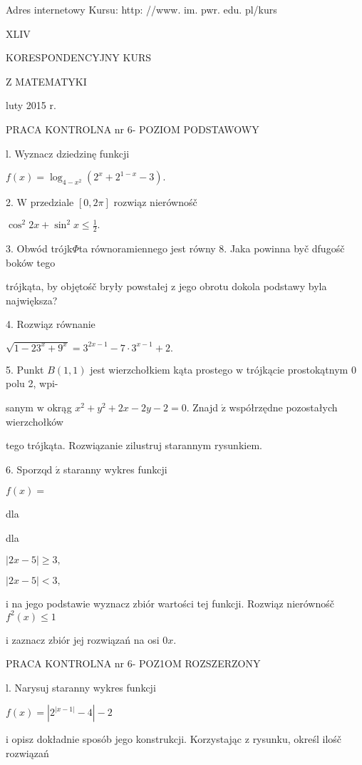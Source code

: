 \documentclass[a4paper,12pt]{article}
\begin{document}
Adres internetowy Kursu: http: //www. im. pwr. edu. pl/kurs







XLIV

KORESPONDENCYJNY KURS

Z MATEMATYKI

luty 2015 r.

PRACA KONTROLNA nr 6- POZIOM PODSTAWOWY

l. Wyznacz dziedzinę funkcji

$f(x)=\log_{4-x^{2}}(2^{x}+2^{1-x}-3).$

2. $\mathrm{W}$ przedziale $[0,2\pi]$ rozwiąz nierównośč

$\displaystyle \cos^{2}2x+\sin^{2}x\leq\frac{1}{2}.$

3. Obwód trójk$\Phi$ta równoramiennego jest równy 8. Jaka powinna byč dfugośč boków tego

trójkąta, by objętośč bryły powstałej $\mathrm{z}$ jego obrotu dokola podstawy byla największa?

4. Rozwiąz równanie

$\sqrt{1-23^{x}+9^{x}}=3^{2x-1}-7\cdot 3^{x-1}+2.$

5. Punkt $B(1,1)$ jest wierzchołkiem kąta prostego $\mathrm{w}$ trójkącie prostokątnym $0$ polu 2, wpi-

sanym $\mathrm{w}$ okrąg $x^{2}+y^{2}+2x-2y-2=0.$ Znajd $\acute{\mathrm{z}}$ współrzędne pozostałych wierzchołków

tego trójkąta. Rozwiązanie zilustruj starannym rysunkiem.

6. Sporzqd $\acute{\mathrm{z}}$ staranny wykres funkcji

$f(x)=$

dla

dla

$|2x-5|\geq 3,$

$|2x-5|<3,$

$\mathrm{i}$ na jego podstawie wyznacz zbiór wartości tej funkcji. Rozwiąz nierównośč $f^{2}(x) \leq 1$

$\mathrm{i}$ zaznacz zbiór jej rozwiązań na osi $0x.$




PRACA KONTROLNA nr 6- POZ1OM ROZSZERZONY

l. Narysuj staranny wykres funkcji

$f(x)=|2^{|x-1|}-4|-2$

$\mathrm{i}$ opisz dokładnie sposób jego konstrukcji. Korzystając $\mathrm{z}$ rysunku, określ ilośč rozwiązań
\end{document}
